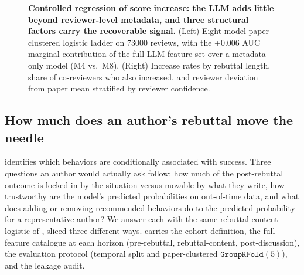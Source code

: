 \documentclass{article}
\begin{document}
\begin{figure}[t]
  \centering
  \caption{\textbf{Controlled regression of score increase: the LLM adds
    little beyond reviewer-level metadata, and three structural factors
    carry the recoverable signal.} (Left) Eight-model paper-clustered
    logistic ladder on \num{73000} reviews, with the +0.006 AUC marginal
    contribution of the full LLM feature set over a metadata-only model
    (M4 vs.\ M8). (Right) Increase rates by rebuttal length, share of
    co-reviewers who also increased, and reviewer deviation from paper
    mean stratified by reviewer confidence.}
  \label{fig:f4-inference}
\end{figure}
\fi

\subsection{How much does an author's rebuttal move the needle}\label{sec:rebuttal-impact}

 identifies which behaviors are conditionally associated with success. Three questions an author would actually ask follow: how much of the post-rebuttal outcome is locked in by the situation versus movable by what they write, how trustworthy are the model's predicted probabilities on out-of-time data, and what does adding or removing recommended behaviors do to the predicted probability for a representative author? We answer each with the same rebuttal-content logistic of , sliced three different ways.  carries the cohort definition, the full feature catalogue at each horizon (pre-rebuttal, rebuttal-content, post-discussion), the evaluation protocol (temporal split and paper-clustered $\texttt{GroupKFold}(5)$), and the leakage audit.
\end{document}
